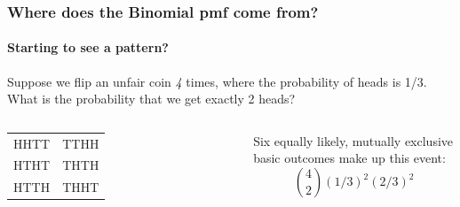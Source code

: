 \documentclass[handout]{beamer}
\begin{document}
\begin{frame}
  \frametitle{Where does the Binomial pmf come from?}
\framesubtitle{Starting to see a pattern?}

Suppose we flip an unfair coin \emph{4} times, where the probability of heads is 1/3. What is the probability that we get exactly 2 heads?

\vspace{2em}



\begin{columns}
\begin{tabular}{cc}
HHTT&TTHH\\
HTHT&THTH\\
HTTH&THHT
\end{tabular}

\alert{Six equally likely, mutually exclusive basic outcomes make up this event:}
$${4\choose 2}(1/3)^2(2/3)^2$$
\end{columns}

\end{frame}

\end{document}
